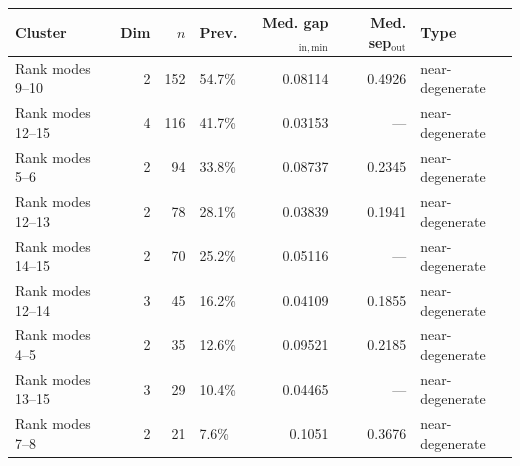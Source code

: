 \begin{tabular}{lrrlrrl}
\toprule
Cluster & Dim & $n$ & Prev. & Med. gap$_{\mathrm{in,min}}$ & Med. sep$_{\mathrm{out}}$ & Type \\
\midrule
Rank modes 9--10 & 2 & 152 & 54.7\% & 0.08114 & 0.4926 & near-degenerate \\
Rank modes 12--15 & 4 & 116 & 41.7\% & 0.03153 & --- & near-degenerate \\
Rank modes 5--6 & 2 & 94 & 33.8\% & 0.08737 & 0.2345 & near-degenerate \\
Rank modes 12--13 & 2 & 78 & 28.1\% & 0.03839 & 0.1941 & near-degenerate \\
Rank modes 14--15 & 2 & 70 & 25.2\% & 0.05116 & --- & near-degenerate \\
Rank modes 12--14 & 3 & 45 & 16.2\% & 0.04109 & 0.1855 & near-degenerate \\
Rank modes 4--5 & 2 & 35 & 12.6\% & 0.09521 & 0.2185 & near-degenerate \\
Rank modes 13--15 & 3 & 29 & 10.4\% & 0.04465 & --- & near-degenerate \\
Rank modes 7--8 & 2 & 21 & 7.6\% & 0.1051 & 0.3676 & near-degenerate \\
\bottomrule
\end{tabular}

